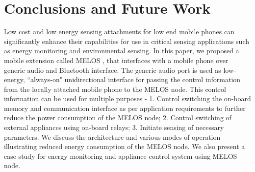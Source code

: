 \documentclass[10pt]{sigplan-proc-varsize}
\newcommand{\melos}{MELOS }
\begin{document}
%
%
%
%

\section{Conclusions and Future Work}
\label{sec:conc}
Low cost and low energy sensing attachments for low end mobile phones can significantly enhance their capabilities for use in critical sensing applications such as energy monitoring and environmental sensing. In this paper, we proposed a mobile extension called \melos, that interfaces with a mobile phone over generic audio and Bluetooth interface. The generic audio port is used as low-energy, ``always-on" unidirectional interface for passing the control information from the locally attached mobile phone to the \melos node. This control information can be used for multiple purposes - 1. Control switching the on-board memory and communication interface as per application requirements to further reduce the power consumption of the \melos node; 2. Control switching of external appliances using on-board relays; 3. Initiate sensing of necessary parameters.
We discuss the architecture and various modes of operation illustrating reduced energy consumption of the \melos node. We also present a case study for energy monitoring and appliance control system using \melos node. 
\end{document}
